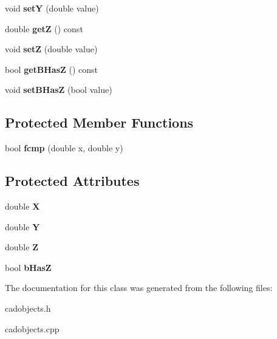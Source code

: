\begin{DoxyCompactItemize}
\item 
void {\bfseries setY} (double value)\hypertarget{class_c_a_d_vector_ae9e42384796dbae87906d2c838f0c51e}{}\label{class_c_a_d_vector_ae9e42384796dbae87906d2c838f0c51e}

\item 
double {\bfseries getZ} () const \hypertarget{class_c_a_d_vector_ac7e24517be791460b53da6d9e83c02a5}{}\label{class_c_a_d_vector_ac7e24517be791460b53da6d9e83c02a5}

\item 
void {\bfseries setZ} (double value)\hypertarget{class_c_a_d_vector_a36c02cb0a9bb5cd2b010cc275cc63504}{}\label{class_c_a_d_vector_a36c02cb0a9bb5cd2b010cc275cc63504}

\item 
bool {\bfseries get\+B\+HasZ} () const \hypertarget{class_c_a_d_vector_aa18dabddf6762b5b48e142c43f957ffd}{}\label{class_c_a_d_vector_aa18dabddf6762b5b48e142c43f957ffd}

\item 
void {\bfseries set\+B\+HasZ} (bool value)\hypertarget{class_c_a_d_vector_ac3962d06d240f9d61be03e5069f2cb03}{}\label{class_c_a_d_vector_ac3962d06d240f9d61be03e5069f2cb03}

\end{DoxyCompactItemize}
\subsection*{Protected Member Functions}
\begin{DoxyCompactItemize}
\item 
bool {\bfseries fcmp} (double x, double y)\hypertarget{class_c_a_d_vector_a0dcdb36dfd6efd2e1c786759cad3ae3e}{}\label{class_c_a_d_vector_a0dcdb36dfd6efd2e1c786759cad3ae3e}

\end{DoxyCompactItemize}
\subsection*{Protected Attributes}
\begin{DoxyCompactItemize}
\item 
double {\bfseries X}\hypertarget{class_c_a_d_vector_a27a5e20c0689bb79dde604a532b16d4c}{}\label{class_c_a_d_vector_a27a5e20c0689bb79dde604a532b16d4c}

\item 
double {\bfseries Y}\hypertarget{class_c_a_d_vector_abc89cdf0bbefbd5de15b96d97070c215}{}\label{class_c_a_d_vector_abc89cdf0bbefbd5de15b96d97070c215}

\item 
double {\bfseries Z}\hypertarget{class_c_a_d_vector_aef6e7c79bf027983467654c618ca6ee2}{}\label{class_c_a_d_vector_aef6e7c79bf027983467654c618ca6ee2}

\item 
bool {\bfseries b\+HasZ}\hypertarget{class_c_a_d_vector_a0b1a923e32dddedcd8cd86b195e30dd9}{}\label{class_c_a_d_vector_a0b1a923e32dddedcd8cd86b195e30dd9}

\end{DoxyCompactItemize}


The documentation for this class was generated from the following files\+:\begin{DoxyCompactItemize}
\item 
cadobjects.\+h\item 
cadobjects.\+cpp\end{DoxyCompactItemize}
